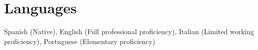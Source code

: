 
\section{Languages}

Spanish (Native), English (Full professional proficiency), Italian (Limited working proficiency), Portuguese (Elementary proficiency)
